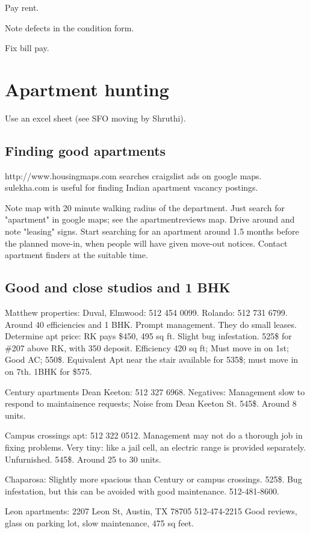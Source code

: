 \documentclass[oneside, article]{memoir}
\begin{document}
Pay rent.

Note defects in the condition form.

Fix bill pay.

\chapter{Apartment hunting}
Use an excel sheet (see SFO moving by Shruthi).

\section{Finding good apartments}
http://www.housingmaps.com searches craigslist ads on google maps. sulekha.com is useful for finding Indian apartment vacancy postings.

Note map with 20 minute walking radius of the department. Just search for "apartment" in google maps; see the apartmentreviews map. Drive around and note "leasing" signs. Start searching for an apartment around 1.5 months before the planned move-in, when people will have given move-out notices. Contact apartment finders at the suitable time.

\section{Good and close studios and 1 BHK}
\subitem Matthew properties: Duval, Elmwood: 512 454 0099. Rolando: 512 731 6799. Around 40 efficiencies and 1 BHK. Prompt management. They do small leases. Determine apt price: RK pays \$450, 495 sq ft. Slight bug infestation. 525\$ for \#207 above RK, with 350 deposit.
\subsubitem Efficiency 420 sq ft; Must move in on 1st; Good AC; 550\$. Equivalent Apt near the stair available for 535\$; must move in on 7th.
\subsubitem 1BHK for \$575.

\subitem Century apartments Dean Keeton: 512 327 6968. Negatives: Management slow to respond to maintainence requests; Noise from Dean Keeton St. 545\$. Around 8 units.

\subitem Campus crossings apt: 512 322 0512. Management may not do a thorough job in fixing problems. Very tiny: like a jail cell, an electric range is provided separately. Unfurnished. 545\$. Around 25 to 30 units.

\subitem Chaparosa: Slightly more spacious than Century or campus crossings. 525\$. Bug infestation, but this can be avoided with good maintenance. 512-481-8600.

\subitem Leon apartments: 2207 Leon St, Austin, TX 78705 512-474-2215 Good reviews, glass on parking lot, slow maintenance, 475 sq feet.
\end{document}

